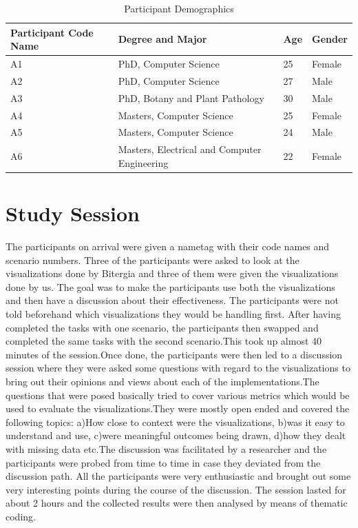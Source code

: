 \documentclass[seploa]{beavtex}
\begin{document}
\begin{table}
\centering
\begin{tabular}{ |p{3cm}||p{5cm}|p{3cm}|p{3cm}|  }
 \hline
Participant Code Name & Degree and Major & Age & Gender\\
 \hline
 A1 & PhD, Computer Science & 25 & Female\\
 A2 & PhD, Computer Science & 27 & Male\\
 A3 & PhD, Botany and Plant Pathology & 30 & Male\\
 A4 & Masters, Computer Science & 25 & Female\\
 A5 & Masters, Computer Science & 24 & Male\\
 A6 & Masters, Electrical and Computer Engineering & 22 & Female\\
 \hline
\end{tabular}
\caption{Participant Demographics}
\label{tab:table1}
\end{table}

\section{Study Session}
The participants on arrival were given a nametag with their code names and scenario numbers. Three of the participants were asked to look at the visualizations done by Bitergia and three of them were given the visualizations done by us. The goal was to make the participants use both the visualizations and then have a discussion about their effectiveness. The participants were not told beforehand which visualizations they would be handling first. After having completed the tasks with one scenario, the participants then swapped and completed the same tasks with the second scenario.This took up almost 40 minutes of the session.Once done, the participants were then led to a discussion session where they were asked some questions with regard to the visualizations to bring out their opinions and views about each of the implementations.The questions that were posed basically tried to cover various metrics which would be used to evaluate the visualizations.They were mostly open ended and covered the following topics: a)How close to context were the visualizations, b)was it easy to understand and use, c)were meaningful outcomes being drawn, d)how they dealt with missing data etc.The discussion was facilitated by a researcher and the participants were probed from time to time in case they deviated from the discussion path. All the participants were very enthusiastic and brought out some very interesting points during the course of the discussion. The session lasted for about 2 hours and the collected results were then analysed by means of thematic coding.
\end{document}
